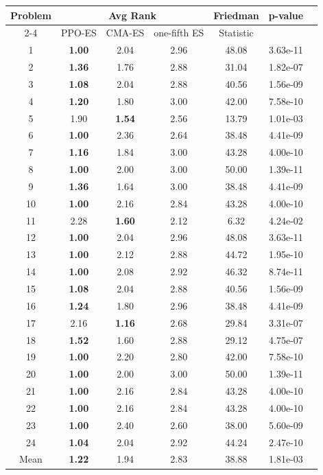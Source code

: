 
        \begin{tabular}{ccccccc}
        \toprule
        \multirow{2}{*}{Problem} & \multicolumn{3}{c}{Avg Rank} & Friedman & \multirow{2}{*}{p-value} \\
        \cline{2-4}
        & PPO-ES & CMA-ES & one-fifth ES & Statistic & \\
        \midrule
        1 & \textbf{1.00} & 2.04 & 2.96 & 48.08 & 3.63e-11 \\
2 & \textbf{1.36} & 1.76 & 2.88 & 31.04 & 1.82e-07 \\
3 & \textbf{1.08} & 2.04 & 2.88 & 40.56 & 1.56e-09 \\
4 & \textbf{1.20} & 1.80 & 3.00 & 42.00 & 7.58e-10 \\
5 & 1.90 & \textbf{1.54} & 2.56 & 13.79 & 1.01e-03 \\
6 & \textbf{1.00} & 2.36 & 2.64 & 38.48 & 4.41e-09 \\
7 & \textbf{1.16} & 1.84 & 3.00 & 43.28 & 4.00e-10 \\
8 & \textbf{1.00} & 2.00 & 3.00 & 50.00 & 1.39e-11 \\
9 & \textbf{1.36} & 1.64 & 3.00 & 38.48 & 4.41e-09 \\
10 & \textbf{1.00} & 2.16 & 2.84 & 43.28 & 4.00e-10 \\
11 & 2.28 & \textbf{1.60} & 2.12 & 6.32 & 4.24e-02 \\
12 & \textbf{1.00} & 2.04 & 2.96 & 48.08 & 3.63e-11 \\
13 & \textbf{1.00} & 2.12 & 2.88 & 44.72 & 1.95e-10 \\
14 & \textbf{1.00} & 2.08 & 2.92 & 46.32 & 8.74e-11 \\
15 & \textbf{1.08} & 2.04 & 2.88 & 40.56 & 1.56e-09 \\
16 & \textbf{1.24} & 1.80 & 2.96 & 38.48 & 4.41e-09 \\
17 & 2.16 & \textbf{1.16} & 2.68 & 29.84 & 3.31e-07 \\
18 & \textbf{1.52} & 1.60 & 2.88 & 29.12 & 4.75e-07 \\
19 & \textbf{1.00} & 2.20 & 2.80 & 42.00 & 7.58e-10 \\
20 & \textbf{1.00} & 2.00 & 3.00 & 50.00 & 1.39e-11 \\
21 & \textbf{1.00} & 2.16 & 2.84 & 43.28 & 4.00e-10 \\
22 & \textbf{1.00} & 2.16 & 2.84 & 43.28 & 4.00e-10 \\
23 & \textbf{1.00} & 2.40 & 2.60 & 38.00 & 5.60e-09 \\
24 & \textbf{1.04} & 2.04 & 2.92 & 44.24 & 2.47e-10 \\
\midrule
Mean & \textbf{1.22} & 1.94 & 2.83 & 38.88 & 1.81e-03 \\
\bottomrule
\end{tabular}